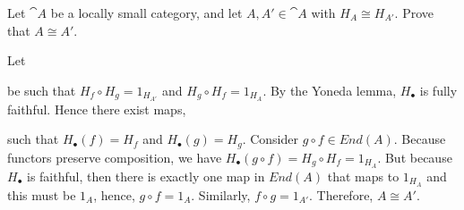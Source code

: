\documentclass[11pt,a4paper]{article}
\begin{document}
\begin{exercise}
    Let $\cat{A}$ be a locally small category, and let $A,A'\in\cat{A}$ with $H_A\cong H_{A'}$. Prove that $A\cong A'$.
\end{exercise}
\begin{solution}
    Let  be such that $H_f\circ H_{g}=1_{H_{A'}}$ and $H_{g}\circ H_f=1_{H_A}$. By the Yoneda lemma, $H_{\bullet}$ is fully faithful. Hence there exist maps,  such that $H_{\bullet}(f)=H_f$ and $H_{\bullet}(g)=H_g$. Consider $g\circ f\in End(A)$. Because functors preserve composition, we have $H_{\bullet}(g\circ f)=H_g\circ H_f=1_{H_{A}}$. But because $H_{\bullet}$ is faithful, then there is exactly one map in $End(A)$ that maps to $1_{H_A}$ and this must be $1_A$, hence, $g\circ f=1_A$. Similarly, $f\circ g=1_{A'}$. Therefore, $A\cong A'$.
\end{solution}
\end{document}
